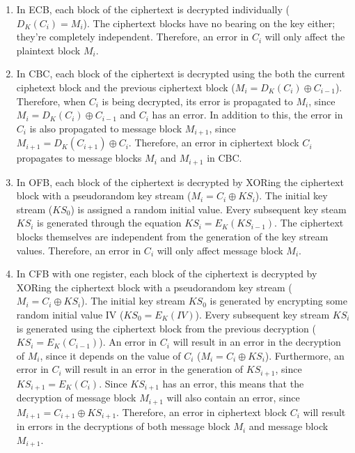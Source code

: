 \documentclass[11pt]{article}
\theoremstyle{definition}
\begin{document}
\begin{enumerate}
\begin{enumerate}
\begin{enumerate}
\item In ECB, each block of the ciphertext is decrypted individually ($D_K(C_i) = M_i$). The ciphertext blocks have no bearing on the key either; they're completely independent. Therefore, an error in $C_i$ will only affect the plaintext block $M_i$.
\\
\item In CBC, each block of the ciphertext is decrypted using the both the current ciphetext block and the previous ciphertext block ($M_i = D_K(C_i) \oplus C_{i-1}$). Therefore, when $C_i$ is being decrypted, its error is propagated to $M_i$, since $M_i = D_K(C_i) \oplus C_{i-1}$ and $C_i$ has an error. In addition to this, the error in $C_i$ is also propagated to message block $M_{i+1}$, since $M_{i+1} = D_K(C_{i+1}) \oplus C_{i}$. Therefore, an error in ciphertext block $C_i$ propagates to message blocks $M_i$ and $M_{i+1}$ in CBC.
\\
\item In OFB, each block of the ciphertext is decrypted by XORing the ciphertext block with a pseudorandom key stream ($M_i = C_i \oplus KS_i$). The initial key stream ($KS_0$) is assigned a random initial value. Every subsequent key steam $KS_i$ is generated through the equation $KS_i = E_K(KS_{i-1})$. The ciphertext blocks themselves are independent from the generation of the key stream values. Therefore, an error in $C_i$ will only affect message block $M_i$.
\\
\item In CFB with one register, each block of the ciphertext is decrypted by XORing the ciphertext block with a pseudorandom key stream ($M_i = C_i \oplus KS_i$). The initial key stream $KS_0$ is generated by encrypting some random initial value IV ($KS_0 = E_K(IV)$). Every subsequent key stream $KS_i$ is generated using the ciphertext block from the previous decryption ($KS_i = E_K(C_{i-1})$). An error in $C_i$ will result in an error in the decryption of $M_i$, since it depends on the value of $C_i$ ($M_i = C_i \oplus KS_i$). Furthermore, an error in $C_i$ will result in an error in the generation of $KS_{i+1}$, since $KS_{i+1} = E_K(C_{i})$. Since $KS_{i+1}$ has an error, this means that the decryption of message block $M_{i+1}$ will also contain an error, since $M_{i+1} = C_{i+1} \oplus KS_{i+1}$. Therefore, an error in ciphertext block $C_i$ will result in errors in the decryptions of both message block $M_i$ and message block $M_{i+1}$.
\\

\end{enumerate}
\end{enumerate}
\end{enumerate}
\end{document}
